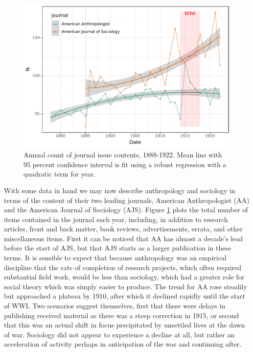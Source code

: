 \documentclass[]{book}
\theoremstyle{definition}
\theoremstyle{definition}
\theoremstyle{definition}
\theoremstyle{remark}
\begin{document}
\begin{figure}

{\centering \includegraphics[width=0.9\linewidth]{04_files/figure-latex/jdpf-desc-1} 

}

\caption{Annual count of journal issue contents, 1888-1922. Mean line with 95 percent confidence interval is fit using a robust regression with a quadratic term for year.}\label{fig:jdpf-desc}
\end{figure}

With some data in hand we may now describe anthropology and sociology in
terms of the content of their two leading journals, American
Anthropologist (AA) and the American Journal of Sociology (AJS). Figure
\ref{fig:jdpf-desc} plots the total number of items contained in the
journal each year, including, in addition to research articles, front
and back matter, book reviews, advertisements, errata, and other
miscellaneous items. First it can be noticed that AA has almost a
decade's lead before the start of AJS, but that AJS starts as a larger
publication in these terms. It is sensible to expect that because
anthropology was an empirical discipline that the rate of completion of
research projects, which often required substantial field work, would be
less than sociology, which had a greater role for social theory which
was simply easier to produce. The trend for AA rose steadily but
approached a plateau by 1910, after which it declined rapidly until the
start of WWI. Two scenarios suggest themselves, first that these were
delays in publishing received material as there was a steep correction
in 1915, or second that this was an actual shift in focus precipitated
by unsettled lives at the dawn of war. Sociology did not appear to
experience a decline at all, but rather an acceleration of activity
perhaps in anticipation of the war and continuing after.
\end{document}
